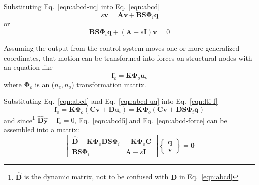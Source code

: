 \documentclass[10pt,openany,twoside]{book}
\numberwithin{equation}{section}   %
\newcommand{\Matrix}[1]{\boldsymbol{#1}}
\newcommand{\Vector}[1]{\boldsymbol{#1}}
\newcommand{\Gc}{GC}
\newcommand{\Eqn}[1]{Eq.\ \ref{#1}}
\begin{document}
Substituting \Eqn{eqn:abcd-uq} into \Eqn{eqn:abcd}
\begin{equation*}
s\Vector{v} = \Vector{Av} + \Matrix{BS\Phi}_i \Vector{q}
\end{equation*}
or
\begin{equation}\label{eqn:abcd5}
\Matrix{BS\Phi}_i \Vector{q} + \left( \Matrix{A} - s\Matrix{I} \right) \Vector{v} = 0
\end{equation}

Assuming the output from the control system moves one or more generalized
coordinates, that motion can be transformed into forces on structural
nodes with an equation like
\begin{equation}\label{eqn:lti-f}
\Vector{f}_o = \Matrix{K}\Matrix{\Phi}_o\Vector{u}_o
\end{equation}
where $\Matrix{\Phi}_o$ is an ($n_e, n_o$) transformation matrix.

Substituting \Eqn{eqn:abcd} and \Eqn{eqn:abcd-uq} into \Eqn{eqn:lti-f}
\begin{equation}\label{eqn:abcd-force}
\Vector{f}_o = \Matrix{K\Phi}_o \left( \Vector{Cv} + \Matrix{D}\Vector{u}_i \right) = \Matrix{K\Phi}_o \left( \Vector{Cv} + \Matrix{DS\Phi}_i \Vector{q} \right)
\end{equation}
and since\footnote{$\hat{\Matrix{D}}$ is the dynamic matrix, not to be confused with $\Matrix{D}$
in \Eqn{eqn:abcd}} $\hat{\Matrix{D}}\hat{\Vector{y}} - \Vector{f}_o = 0$,
\Eqn{eqn:abcd5} and \Eqn{eqn:abcd-force} can be assembled into a matrix:
\begin{equation}\label{eqn:abcd-combtd}
\left[ \begin{array}{cc}
	\hat{\Matrix{D}} -\Matrix{K}\Matrix{\Phi}_o\Matrix{DS\Phi}_i
	& -\Matrix{K}\Matrix{\Phi}_o\Matrix{C}   \\
	\Matrix{BS\Phi}_i  &  \Matrix{A} - s\Matrix{I}
\end{array} \right]
\left\{ \begin{array}{c}
\Vector{q} \\
\Vector{v}
\end{array} \right\} = \Vector{0}
\end{equation}

\end{document}
